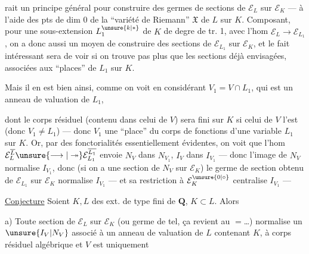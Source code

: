 
rait un principe général pour construire des germes de sections de $\mathcal E_L$ sur $\mathcal E_K$ --- à l'aide des pts de dim 0 de la ``variété de Riemann'' $\mathfrak X$ de $L$ sur $K$. Composant, pour une sous-extension $L_1^{\unsure{k|*}}$ de $K$ de degre de tr. 1, avec l'hom $\mathcal E_L\longrightarrow\mathcal E_{L_1}$, on a donc aussi un moyen de construire des  sections de $\mathcal E_{L_1}$ sur $\mathcal E_K$, et le fait intéressant sera de voir si on  trouve pas plus que les sections déjà envisagées, associées aux ``places'' de $L_1$ sur $K$.

Mais il en est bien ainsi, comme on voit en considérant $V_1=V\cap L_1$, qui est un anneau de valuation de $L_1$,

dont le corps résiduel (contenu dans celui de
$V$) sera  fini sur $K$ si celui de $V$
l'est (donc $V_1\ne L_1$) --- donc $V_1$ \deleted{$\longrightarrow$}  une
``place'' du corps de fonctions d'une variable
$L_1$ sur $K$. Or, par des fonctorialités
essentiellement évidentes, on voit que
l'hom $\mathcal E_L^{\overline L}\unsure{\longrightarrow|\twoheadrightarrow}\mathcal E_{L_1}^{\overline{L_1}}$ envoie $N_V$ dans $N_{V_1}$,
$I_V$ dans $I_{V_1}$ --- donc l'image de $N_V$
normalise $I_{V_1}$, donc (si on a une  section
de $N_V$ sur $\mathcal E_K$) le germe de section
obtenu de $\mathcal E_{L_1}$ sur $\mathcal E_K$ normalise $I_{V_1}$
--- et sa restriction à $\mathcal E_K^{\unsure{0|\circ}}$ centralise
$I_{V_1}$ ---

\uline{Conjecture} Soient $K,L$ des ext. de
type fini de $\mathbf Q$, $K\subset L$. Alors

a) Toute section de $\mathcal E_L$ sur $\mathcal E_K$
(ou germe de tel, ça revient au $=$\ldots)
normalise un $\unsure{I_V|N_V}$ associé à un anneau
de valuation  de $L$ contenant $K$, à corps
résiduel algébrique  \deleted{\unsure{,}} et  $V$ est uniquement

